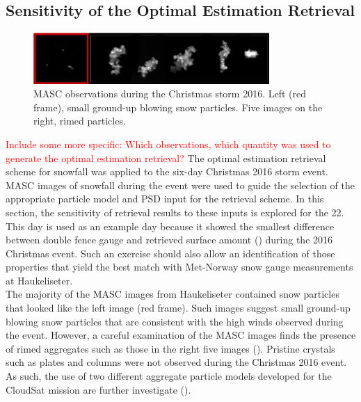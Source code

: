 \subsection{Sensitivity of the Optimal Estimation Retrieval}\label{sec:ret:sensitivity}
\begin{figure}[h]
	\centering
	\includegraphics[width=0.8\textwidth]{./MASC_obs/blow_part}
	\caption{MASC observations during the Christmas storm 2016. Left (red frame), small ground-up blowing snow particles. Five images on the right, rimed particles.}\label{fig:ret:all_part}
\end{figure}
\noindent
\textcolor{red}{Include some more specific: Which observations, which quantity was used to generate the optimal estimation retrieval? }
The optimal estimation retrieval scheme for snowfall was applied to the six-day Christmas 2016 storm event.  MASC images of snowfall during the event were used to guide the selection of the appropriate particle model and PSD input for the retrieval scheme. In this section, the sensitivity of retrieval results to these inputs is explored for the \SI{22}{\dec}. 
This day is used as an example day because it showed the smallest difference between double fence gauge and retrieved surface amount () during the 2016 Christmas event.
Such an exercise should also allow an identification of those properties that yield the best match with Met-Norway snow gauge measurements at Haukeliseter.  
\\
The majority of the MASC images from Haukeliseter contained snow particles that looked like the left image  (red frame). Such images suggest small ground-up blowing snow particles that are consistent with the high winds observed during the event.  However, a careful examination of the MASC images finds the presence of rimed aggregates such as those in the right five images (). Pristine crystals such as plates and columns were not observed during the Christmas 2016 event.  As such, the use of two different aggregate particle models developed for the CloudSat mission are further investigate (). 
\\
